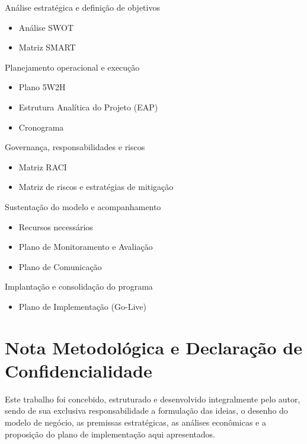 \documentclass[12pt]{article}
\begin{document}
\begin{hlevelone}
\item Análise estratégica e definição de objetivos  
\begin{itemize}
\item Análise SWOT
\item Matriz SMART
\end{itemize}

\item Planejamento operacional e execução  
\begin{itemize}
\item Plano 5W2H
\item Estrutura Analítica do Projeto (EAP)
\item Cronograma
\end{itemize}

\item Governança, responsabilidades e riscos  
\begin{itemize}
\item Matriz RACI
\item Matriz de riscos e estratégias de mitigação
\end{itemize}

\item Sustentação do modelo e acompanhamento  
\begin{itemize}
\item Recursos necessários
\item Plano de Monitoramento e Avaliação
\item Plano de Comunicação
\end{itemize}

\item Implantação e consolidação do programa  
\begin{itemize}
\item Plano de Implementação (Go-Live)
\end{itemize}
\end{hlevelone}

\FGVNewPage

\section{Nota Metodológica e Declaração de Confidencialidade}
\label{sec:org0a7103a}
Este trabalho foi concebido, estruturado e desenvolvido integralmente pelo autor, sendo de sua exclusiva responsabilidade a formulação das ideias, o desenho do modelo de negócio, as premissas estratégicas, as análises econômicas e a proposição do plano de implementação aqui apresentados.
\end{document}
